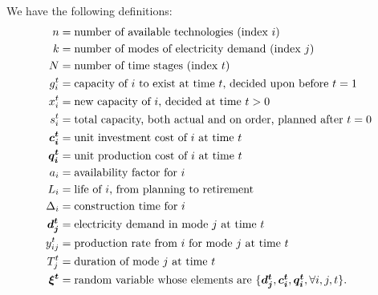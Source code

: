 We have the following definitions:
{\allowdisplaybreaks
\begin{align*}
n 	&= 	\mbox{number of available technologies (index $i$)}\\
k	&=	\mbox{number of modes of electricity demand (index $j$)}\\
N	&=	\mbox{number of time stages (index $t$)}\\
g_i^t	&=	\mbox{capacity of $i$ to exist at time $t$, decided upon before $t=1$}\\
x_i^t	&=	\mbox{new capacity of $i$, decided at time $t>0$}\\
s_i^t	&=	\mbox{total capacity, both actual and on order, planned after $t=0$}\\
\mathbf{\boldsymbol{c_i^t}}	&=	\mbox{unit investment cost of $i$ at time $t$}\\
\mathbf{\boldsymbol{q_i^t}}	&=	\mbox{unit production cost of $i$ at time $t$}\\
a_i	&=	\mbox{availability factor for $i$}\\
L_i	&=	\mbox{life of $i$, from planning to retirement}\\
\Delta_i	&=	\mbox{construction time for $i$}\\
\mathbf{\boldsymbol{d_j^t}}	&=	\mbox{electricity demand in mode $j$ at time $t$}\\
y_{ij}^t	&=	\mbox{production rate from $i$ for mode $j$ at time $t$}\\
T_j^t	&=	\mbox{duration of mode $j$ at time $t$}\\
\mathbf{\boldsymbol{\xi^t}}	&=	\mbox{random variable whose elements are $\{\mathbf{\boldsymbol{d_j^t}},\mathbf{\boldsymbol{c_i^t}},\mathbf{\boldsymbol{q_i^t}}, \forall i,j,t\}$}.
\end{align*}
}

